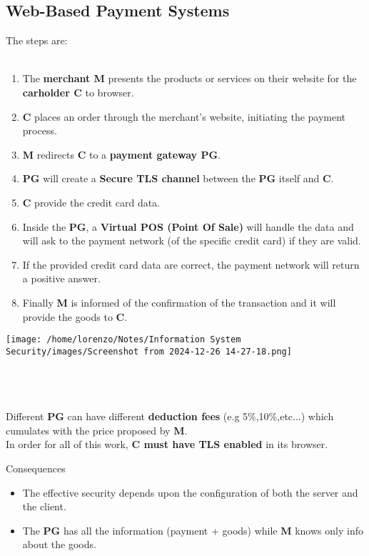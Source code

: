 \subsection{Web-Based Payment Systems}
The steps are:
\\
\\
\begin{minipage}{0.6\textwidth}
    \begin{enumerate}
        \item The \textbf{merchant M} presents the products or services on their website for the \textbf{carholder C} to browser. 
        \item \textbf{C} places an order through the merchant's website, initiating the payment process.
        \item \textbf{M} redirects \textbf{C} to a \textbf{payment gateway PG}.
        \item \textbf{PG} will create a \textbf{Secure TLS channel} between the \textbf{PG} itself and \textbf{C}.
        \item \textbf{C} provide the credit card data.
        \item Inside the \textbf{PG}, a \textbf{Virtual POS (Point Of Sale)} will handle the data and will ask to the payment network (of the specific credit card) if they are valid.
        \item If the provided credit card data are correct, the payment network will return a
        positive answer.
        \item Finally \textbf{M} is informed of the confirmation of the transaction and it will provide the goods to \textbf{C}.
    \end{enumerate} 
\end{minipage} 
\hspace{0.3cm}
\begin{minipage}{0.4\textwidth}
    \centering
    \texttt{[image: /home/lorenzo/Notes/Information System Security/images/Screenshot from 2024-12-26 14-27-18.png]}
\end{minipage}
\noindent
\\
\\
\\
Different \textbf{PG} can have different \textbf{deduction fees} (e.g 5\%,10\%,etc...) which cumulates with the price proposed by \textbf{M}.\\
In order for all of this work, \textbf{C must have TLS enabled} in its browser. 
\begin{quotebox-grey}{Consequences}
\begin{itemize}
    \item The effective security depends upon the configuration of both the server and the client.
    \item The \textbf{PG} has all the information (payment + goods) while \textbf{M} knows only info about the goods.
\end{itemize}
\end{quotebox-grey}


